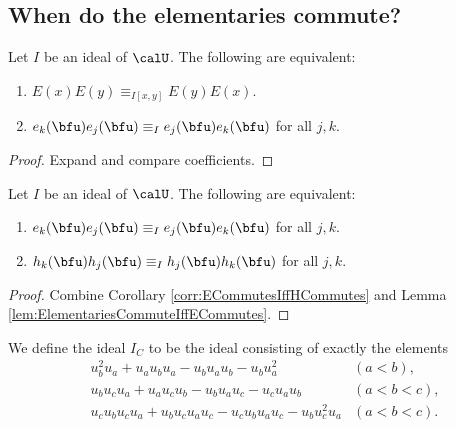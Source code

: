 \documentclass{article}
\begin{document}
\subsection{
    When do the elementaries commute?
}

\begin{lemma}
    \label{lem:ElementariesCommuteIffECommutes}
    Let $I$ be an ideal of $\calU$.
    The following are equivalent:
    \begin{enumerate}[label=(\alph*)]
        \item 
            $E(x)E(y) \equiv_{I[x,y]} E(y)E(x)$.
        \item 
            $e_k(\bfu)e_j(\bfu) \equiv_I e_j(\bfu)e_k(\bfu)$ for all $j,k$. 
    \end{enumerate}
\end{lemma}

\begin{proof}
    Expand and compare coefficients.
\end{proof}

\begin{lemma}
    Let $I$ be an ideal of $\calU$.
    The following are equivalent:
    \begin{enumerate}[label=(\alph*)]
        \item 
            $e_k(\bfu)e_j(\bfu) \equiv_I e_j(\bfu)e_k(\bfu)$ for all $j,k$. 
        \item 
            $h_k(\bfu)h_j(\bfu) \equiv_I h_j(\bfu)h_k(\bfu)$ for all $j,k$.
    \end{enumerate}
\end{lemma}

\begin{proof}
    Combine Corollary \ref{corr:ECommutesIffHCommutes} and Lemma \ref{lem:ElementariesCommuteIffECommutes}.
\end{proof}


\begin{definition}
    We define the ideal $I_C$ to be the ideal consisting of exactly the elements
    \begin{align}
        &
        u_b^2u_a + u_au_bu_a - u_bu_au_b - u_bu_a^2 
        &
        (a<b),
        \\
        &
        u_bu_cu_a + u_au_cu_b - u_bu_au_c - u_cu_au_b
        &
        (a<b<c),
        \\
        &
        u_cu_bu_cu_a + u_bu_cu_au_c - u_cu_bu_au_c - u_bu_c^2u_a
        &
        (a<b<c).
    \end{align}
\end{definition}
\end{document}
